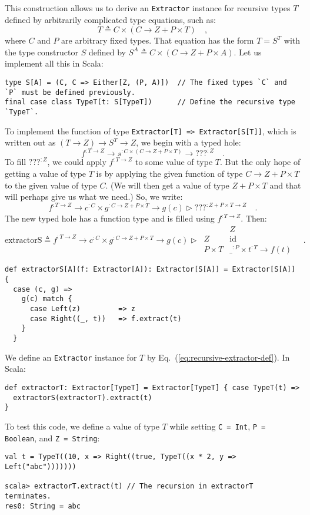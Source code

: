 This construction allows us to derive an \lstinline!Extractor! instance
for recursive types $T$ defined by arbitrarily complicated type equations,
such as:
\[
T\triangleq C\times\left(C\rightarrow Z+P\times T\right)\quad,
\]
where $C$ and $P$ are arbitrary fixed types. That equation has the
form $T=S^{T}$ with the type constructor $S$ defined by $S^{A}\triangleq C\times\left(C\rightarrow Z+P\times A\right)$.
Let us implement all this in Scala:
\begin{lstlisting}
type S[A] = (C, C => Either[Z, (P, A)])  // The fixed types `C` and `P` must be defined previously.
final case class TypeT(t: S[TypeT])      // Define the recursive type `TypeT`. 
\end{lstlisting}
To implement the function of type \lstinline!Extractor[T] => Extractor[S[T]]!,
which is written out as $\left(T\rightarrow Z\right)\rightarrow S^{T}\rightarrow Z$,
we begin with a typed hole:
\[
f^{:T\rightarrow Z}\rightarrow s^{:C\times\left(C\rightarrow Z+P\times T\right)}\rightarrow\text{???}^{:Z}\quad.
\]
To fill $\text{???}^{:Z}$, we could apply $f^{:T\rightarrow Z}$
to some value of type $T$. But the only hope of getting a value of
type $T$ is by applying the given function of type $C\rightarrow Z+P\times T$
to the given value of type $C$. (We will then get a value of type
$Z+P\times T$ and that will perhaps give us what we need.) So, we
write:
\[
f^{:T\rightarrow Z}\rightarrow c^{:C}\times g^{:C\rightarrow Z+P\times T}\rightarrow g(c)\triangleright\text{???}^{:Z+P\times T\rightarrow Z}\quad.
\]
The new typed hole has a function type and is filled using $f^{:T\rightarrow Z}$.
Then:
\[
\text{extractorS}\triangleq f^{:T\rightarrow Z}\rightarrow c^{:C}\times g^{:C\rightarrow Z+P\times T}\rightarrow g(c)\triangleright\,\begin{array}{|c||c|}
 & Z\\
\hline Z & \text{id}\\
P\times T & \_^{:P}\times t^{:T}\rightarrow f(t)
\end{array}\quad.
\]
\begin{lstlisting}
def extractorS[A](f: Extractor[A]): Extractor[S[A]] = Extractor[S[A]] {
  case (c, g) =>
    g(c) match {
      case Left(z)         => z
      case Right((_, t))   => f.extract(t)
    }
  }
\end{lstlisting}

We define an \lstinline!Extractor! instance for $T$ by Eq.~(\ref{eq:recursive-extractor-def}).
In Scala:
\begin{lstlisting}
def extractorT: Extractor[TypeT] = Extractor[TypeT] { case TypeT(t) =>
  extractorS(extractorT).extract(t)
}
\end{lstlisting}
To test this code, we define a value of type $T$ while setting \lstinline!C = Int!,
\lstinline!P = Boolean!, and \lstinline!Z = String!:
\begin{lstlisting}
val t = TypeT((10, x => Right((true, TypeT((x * 2, y => Left("abc")))))))

scala> extractorT.extract(t) // The recursion in extractorT terminates.
res0: String = abc
\end{lstlisting}


